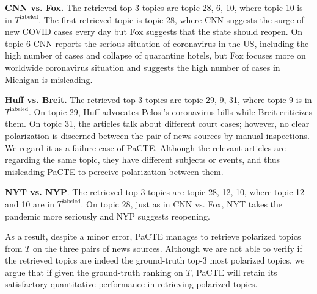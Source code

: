 \documentclass[11pt]{article}
\begin{document}
\textbf{CNN vs. Fox.} The retrieved top-3 topics are topic 28, 6, 10, where topic 10 is in $T^{\text{labeled}}$.
The first retrieved topic is topic 28, where CNN suggests the surge of new COVID cases every day but Fox suggests that the state should reopen. On topic 6 CNN reports the serious situation of coronavirus in the US, including the high number of cases and collapse of quarantine hotels, but Fox focuses more on worldwide coronavirus situation and suggests the high number of cases in Michigan is misleading. 

\textbf{Huff vs. Breit.} The retrieved top-3 topics are topic 29, 9, 31, where topic 9 is in $T^{\text{labeled}}$.
On topic 29, Huff advocates Pelosi's coronavirus bills while Breit criticizes them.
On topic 31, the articles talk about different court cases; however, no clear polarization is discerned between the pair of news sources by manual inspections. We regard it as a failure case of PaCTE. Although the relevant articles are regarding the same topic, they have different subjects or events, and thus misleading PaCTE to perceive polarization between them. 

\textbf{NYT vs. NYP}. The retrieved top-3 topics are topic 28, 12, 10, where topic 12 and 10 are in $T^{\text{labeled}}$.
On topic 28, just as in CNN vs. Fox, NYT takes the pandemic more seriously and NYP suggests reopening. 

As a result, despite a minor error, PaCTE manages to retrieve polarized topics from $T$ on the three pairs of news sources. Although we are not able to verify if the retrieved topics are indeed the ground-truth top-3 most polarized topics, we argue that if given the ground-truth ranking on $T$, PaCTE will retain its satisfactory quantitative performance in retrieving polarized topics.
\end{document}
